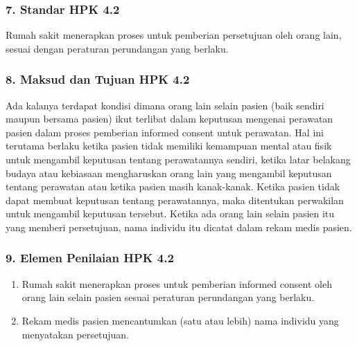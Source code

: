 \documentclass[
]{book}
\providecommand{\tightlist}{%
  \setlength{\itemsep}{0pt}\setlength{\parskip}{0pt}}
\begin{document}
\hypertarget{standar-hpk-4.2}{%
\subsubsection*{7. Standar HPK 4.2}\label{standar-hpk-4.2}}

Rumah sakit menerapkan proses untuk pemberian persetujuan oleh orang lain, sesuai dengan peraturan perundangan yang berlaku.

\hypertarget{maksud-dan-tujuan-hpk-4.2}{%
\subsubsection*{8. Maksud dan Tujuan HPK 4.2}\label{maksud-dan-tujuan-hpk-4.2}}

Ada kalanya terdapat kondisi dimana orang lain selain pasien (baik sendiri maupun bersama pasien) ikut terlibat dalam keputusan mengenai perawatan pasien dalam proses pemberian informed consent untuk perawatan. Hal ini terutama berlaku ketika pasien tidak memiliki kemampuan mental atau fisik untuk mengambil keputusan tentang perawatannya sendiri, ketika latar belakang budaya atau kebiasaan mengharuskan orang lain yang mengambil keputusan tentang perawatan atau ketika pasien masih kanak-kanak. Ketika pasien tidak dapat membuat keputusan tentang perawatannya, maka ditentukan perwakilan untuk mengambil keputusan tersebut. Ketika ada orang lain selain pasien itu yang memberi persetujuan, nama individu itu dicatat dalam rekam medis pasien.

\hypertarget{elemen-penilaian-hpk-4.2}{%
\subsubsection*{9. Elemen Penilaian HPK 4.2}\label{elemen-penilaian-hpk-4.2}}

\begin{enumerate}
\def\labelenumi{\alph{enumi}.}
\tightlist
\item
  Rumah sakit menerapkan proses untuk pemberian informed consent oleh orang lain selain pasien sesuai peraturan perundangan yang berlaku.
\item
  Rekam medis pasien mencantumkan (satu atau lebih) nama individu yang menyatakan persetujuan.
\end{enumerate}
\end{document}
